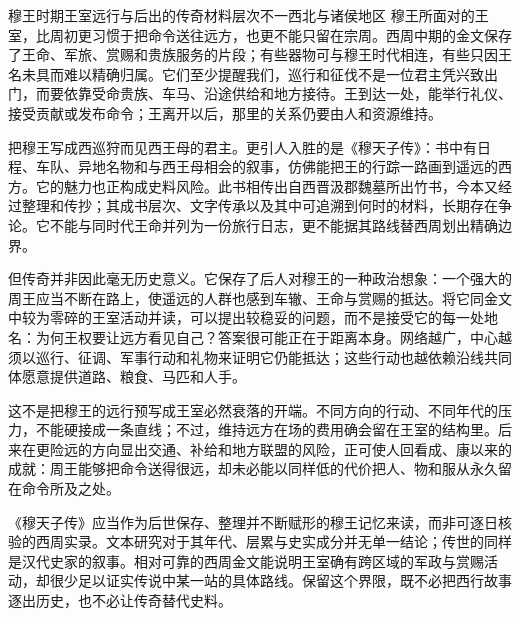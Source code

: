 \begin{event}{穆王时期}{王室远行与后出的传奇}{材料层次不一}{西北与诸侯地区}
穆王所面对的王室，比周初更习惯于把命令送往远方，也更不能只留在宗周。西周中期的金文保存了王命、军旅、赏赐和贵族服务的片段；有些器物可与穆王时代相连，有些只因王名未具而难以精确归属。它们至少提醒我们，巡行和征伐不是一位君主凭兴致出门，而要依靠受命贵族、车马、沿途供给和地方接待。王到达一处，能举行礼仪、接受贡献或发布命令；王离开以后，那里的关系仍要由人和资源维持。

把穆王写成西巡狩而见西王母的君主。更引人入胜的是《穆天子传》：书中有日程、车队、异地名物和与西王母相会的叙事，仿佛能把王的行踪一路画到遥远的西方。它的魅力也正构成史料风险。此书相传出自西晋汲郡魏墓所出竹书，今本又经过整理和传抄；其成书层次、文字传承以及其中可追溯到何时的材料，长期存在争论。它不能与同时代王命并列为一份旅行日志，更不能据其路线替西周划出精确边界。

但传奇并非因此毫无历史意义。它保存了后人对穆王的一种政治想象：一个强大的周王应当不断在路上，使遥远的人群也感到车辙、王命与赏赐的抵达。将它同金文中较为零碎的王室活动并读，可以提出较稳妥的问题，而不是接受它的每一处地名：为何王权要让远方看见自己？答案很可能正在于距离本身。网络越广，中心越须以巡行、征调、军事行动和礼物来证明它仍能抵达；这些行动也越依赖沿线共同体愿意提供道路、粮食、马匹和人手。

这不是把穆王的远行预写成王室必然衰落的开端。不同方向的行动、不同年代的压力，不能硬接成一条直线；不过，维持远方在场的费用确会留在王室的结构里。后来在更险远的方向显出交通、补给和地方联盟的风险，正可使人回看成、康以来的成就：周王能够把命令送得很远，却未必能以同样低的代价把人、物和服从永久留在命令所及之处。
\end{event}

\begin{debate}
《穆天子传》应当作为后世保存、整理并不断赋形的穆王记忆来读，而非可逐日核验的西周实录。文本研究对于其年代、层累与史实成分并无单一结论；传世的同样是汉代史家的叙事。相对可靠的西周金文能说明王室确有跨区域的军政与赏赐活动，却很少足以证实传说中某一站的具体路线。保留这个界限，既不必把西行故事逐出历史，也不必让传奇替代史料。
\end{debate}
